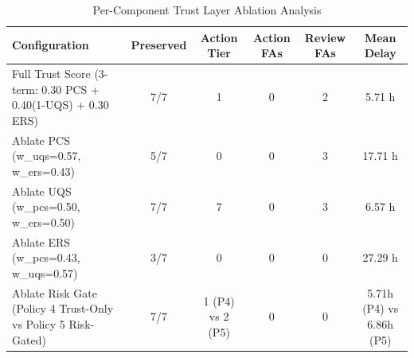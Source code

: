 \begin{table}[htbp]
\centering
\caption{Per-Component Trust Layer Ablation Analysis}
\label{tab:component_ablation}
\begin{tabular}{lccccc}
\toprule
Configuration & Preserved & Action Tier & Action FAs & Review FAs & Mean Delay \\
\midrule
Full Trust Score (3-term: 0.30 PCS + 0.40(1-UQS) + 0.30 ERS) & 7/7 & 1 & 0 & 2 & 5.71 h \\
Ablate PCS (w_uqs=0.57, w_ers=0.43) & 5/7 & 0 & 0 & 3 & 17.71 h \\
Ablate UQS (w_pcs=0.50, w_ers=0.50) & 7/7 & 7 & 0 & 3 & 6.57 h \\
Ablate ERS (w_pcs=0.43, w_uqs=0.57) & 3/7 & 0 & 0 & 0 & 27.29 h \\
Ablate Risk Gate (Policy 4 Trust-Only vs Policy 5 Risk-Gated) & 7/7 & 1 (P4) vs 2 (P5) & 0 & 0 & 5.71h (P4) vs 6.86h (P5) \\
\bottomrule
\end{tabular}
\end{table}
